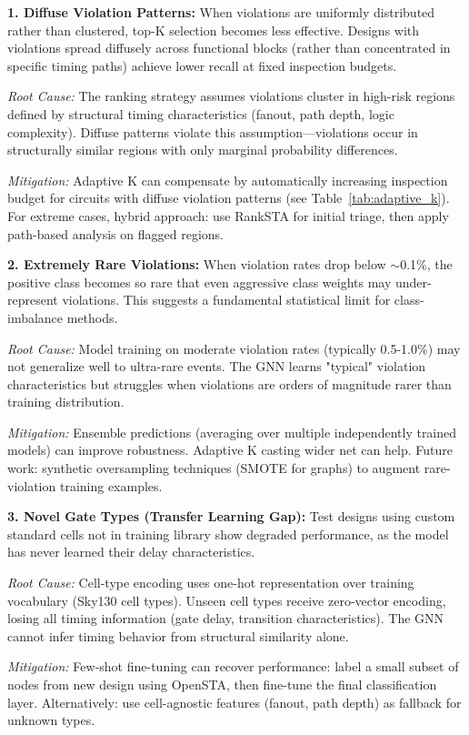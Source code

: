 \documentclass[10pt,twocolumn,journal]{IEEEtran}
\begin{document}
\textbf{1. Diffuse Violation Patterns:}
When violations are uniformly distributed rather than clustered, top-K selection becomes less effective. Designs with violations spread diffusely across functional blocks (rather than concentrated in specific timing paths) achieve lower recall at fixed inspection budgets.

\textit{Root Cause:} The ranking strategy assumes violations cluster in high-risk regions defined by structural timing characteristics (fanout, path depth, logic complexity). Diffuse patterns violate this assumption---violations occur in structurally similar regions with only marginal probability differences.

\textit{Mitigation:} Adaptive K can compensate by automatically increasing inspection budget for circuits with diffuse violation patterns (see Table~\ref{tab:adaptive_k}). For extreme cases, hybrid approach: use RankSTA for initial triage, then apply path-based analysis on flagged regions.

\textbf{2. Extremely Rare Violations:}
When violation rates drop below $\sim$0.1\%, the positive class becomes so rare that even aggressive class weights may under-represent violations. This suggests a fundamental statistical limit for class-imbalance methods.

\textit{Root Cause:} Model training on moderate violation rates (typically 0.5-1.0\%) may not generalize well to ultra-rare events. The GNN learns "typical" violation characteristics but struggles when violations are orders of magnitude rarer than training distribution.  

\textit{Mitigation:} Ensemble predictions (averaging over multiple independently trained models) can improve robustness. Adaptive K casting wider net can help. Future work: synthetic oversampling techniques (SMOTE for graphs) to augment rare-violation training examples.

\textbf{3. Novel Gate Types (Transfer Learning Gap):}
Test designs using custom standard cells not in training library show degraded performance, as the model has never learned their delay characteristics.

\textit{Root Cause:} Cell-type encoding uses one-hot representation over training vocabulary (Sky130 cell types). Unseen cell types receive zero-vector encoding, losing all timing information (gate delay, transition characteristics). The GNN cannot infer timing behavior from structural similarity alone.

\textit{Mitigation:} Few-shot fine-tuning can recover performance: label a small subset of nodes from new design using OpenSTA, then fine-tune the final classification layer. Alternatively: use cell-agnostic features (fanout, path depth) as fallback for unknown types.
\end{document}
